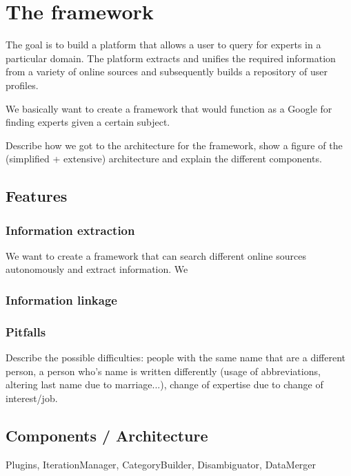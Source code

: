 \chapter{The framework}

The goal is to build a platform that allows a user to query for experts in a particular domain. The
platform extracts and unifies the required information from a variety of online sources and
subsequently builds a repository of user profiles.

We basically want to create a framework that would function as a Google for finding experts given a certain subject.

Describe how we got to the architecture for the framework, show a figure of the (simplified + extensive) architecture and explain the different components.

\section{Features}

\subsection{Information extraction}

We want to create a framework that can search different online sources autonomously and extract information. We 


\subsection{Information linkage}



\subsection{Pitfalls}

Describe the possible difficulties: people with the same name that are a different person, a person who's name is written differently (usage of abbreviations, altering last name due to marriage...), change of expertise due to change of interest/job.

\section{Components / Architecture}

Plugins, IterationManager, CategoryBuilder, Disambiguator, DataMerger

